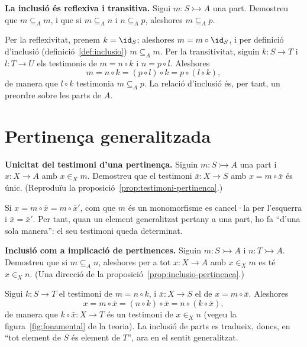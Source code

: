 \begin{exercici}
\textbf{La inclusió és reflexiva i transitiva.} Sigui \(m:S\rightarrowtail A\) una part. Demostreu que \(m\subseteq_A m\), i que si \(m\subseteq_A n\) i \(n\subseteq_A p\), aleshores \(m\subseteq_A p\).
\end{exercici}
\begin{solucio}
Per la reflexivitat, prenem \(k=\id_S\); aleshores \(m=m\circ\id_S\), i per definició d'inclusió (definició~\ref{def:inclusio}) \(m\subseteq_A m\). Per la transitivitat, siguin \(k:S\to T\) i \(l:T\to U\) els testimonis de \(m=n\circ k\) i \(n=p\circ l\). Aleshores
\[
m=n\circ k=(p\circ l)\circ k=p\circ(l\circ k),
\]
de manera que \(l\circ k\) testimonia \(m\subseteq_A p\). La relació d'inclusió és, per tant, un preordre sobre les parts de \(A\).
\end{solucio}

\section{Pertinença generalitzada}\label{prac:pertinenca}

\begin{exercici}
\textbf{Unicitat del testimoni d'una pertinença.} Siguin \(m:S\rightarrowtail A\) una part i \(x:X\to A\) amb \(x\in_X m\). Demostreu que el testimoni \(\bar x:X\to S\) amb \(x=m\circ\bar x\) és únic. (Reproduïu la proposició~\ref{prop:testimoni-pertinenca}.)
\end{exercici}
\begin{solucio}
Si \(x=m\circ\bar x=m\circ\bar x'\), com que \(m\) és un monomorfisme es cancel·la per l'esquerra i \(\bar x=\bar x'\). Per tant, quan un element generalitzat pertany a una part, ho fa \enquote{d'una sola manera}: el seu testimoni queda determinat.
\end{solucio}

\begin{exercici}
\textbf{Inclusió com a implicació de pertinences.} Siguin \(m:S\rightarrowtail A\) i \(n:T\rightarrowtail A\). Demostreu que si \(m\subseteq_A n\), aleshores per a tot \(x:X\to A\) amb \(x\in_X m\) es té \(x\in_X n\). (Una direcció de la proposició~\ref{prop:inclusio-pertinenca}.)
\end{exercici}
\begin{solucio}
Sigui \(k:S\to T\) el testimoni de \(m=n\circ k\), i \(\bar x:X\to S\) el de \(x=m\circ\bar x\). Aleshores
\[
x=m\circ\bar x=(n\circ k)\circ\bar x=n\circ(k\circ\bar x),
\]
de manera que \(k\circ\bar x:X\to T\) és un testimoni de \(x\in_X n\) (vegeu la figura~\ref{fig:fonamental} de la teoria). La inclusió de parts es tradueix, doncs, en \enquote{tot element de \(S\) és element de \(T\)}, ara en el sentit generalitzat.
\end{solucio}

